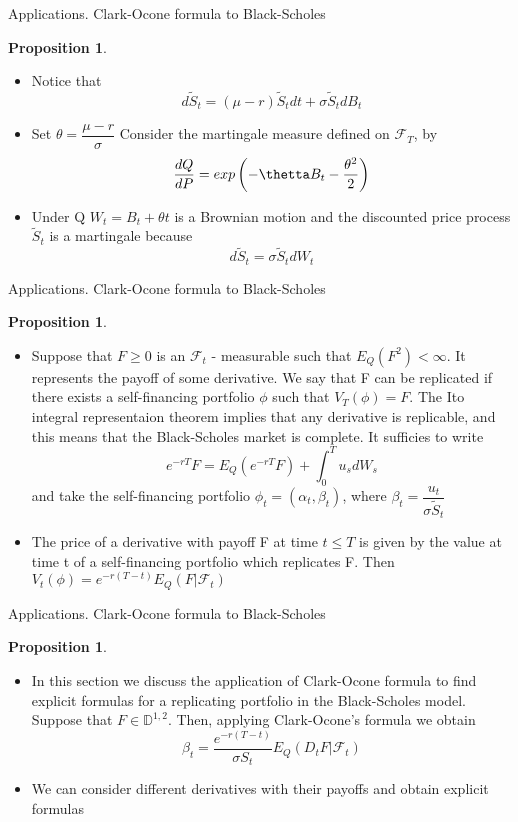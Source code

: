 \documentclass{beamer}%
\theoremstyle{definition}
\newtheorem{proposition}[theorem]{Proposition}
\begin{document}
\begin{frame}{Applications. Clark-Ocone formula to Black-Scholes}
\begin{proposition}
\begin{itemize}

\item Notice that $$d\tilde{S}_t = (\mu - r)\tilde{S}_tdt + \sigma \tilde{S}_t dB_t$$
\item Set $\theta = \dfrac{\mu - r}{\sigma}$ Consider the martingale measure defined on $\mathcal{F}_T$, by 
$$\dfrac{dQ}{dP} = exp\left(-\thetta B_t - \dfrac{\theta^2}{2}\right)$$
\item Under Q $W_t = B_t + \theta t$ is a Brownian motion and the discounted price process $\tilde{S}_t$ is a martingale because
$$d\tilde{S}_t = \sigma \tilde{S}_t dW_t$$
\end{itemize}
\end{proposition}
\end{frame}

\begin{frame}{Applications. Clark-Ocone formula to Black-Scholes}
\begin{proposition}
\begin{itemize}

\item Suppose that $F \ge 0$ is an $\mathcal{F}_t$ - measurable such that $E_{Q}(F^2) < \infty$. It represents the payoff of some derivative. We say that F can be replicated if there exists a self-financing portfolio $\phi$ such that $V_{T}(\phi) = F$. The Ito integral representaion theorem implies that any derivative is replicable, and this means that the Black-Scholes market is complete. It sufficies to write
$$e^{-rT}F = E_{Q}(e^{-rT}F) + \int_{0}^{T} u_sdW_s$$
and take the self-financing portfolio $\phi_t = (\alpha_t, \beta_t)$, where $\beta_t = \dfrac{u_t}{\sigma \tilde{S}_t}$
\item The price of a derivative with payoff F at time $t \leq T$ is given by the value at time t of a self-financing portfolio which replicates F. Then $V_t(\phi)  = e^{-r(T-t)}E_{Q}(F|\mathcal{F}_t)$ 
\end{itemize}
\end{proposition}
\end{frame}

\begin{frame}{Applications. Clark-Ocone formula to Black-Scholes}
\begin{proposition}
\begin{itemize}

\item In this section we discuss the application of Clark-Ocone formula to find explicit formulas for a replicating portfolio in the Black-Scholes model. Suppose that $F \in \mathbb{D}^{1,2}$. Then, applying Clark-Ocone's formula we obtain 
$$\beta_t = \dfrac{e^{-r(T-t)}}{\sigma S_t}E_Q(D_tF|\mathcal{F}_t)$$
\item We can consider different derivatives with their payoffs and obtain explicit formulas
\end{itemize}
\end{proposition}
\end{frame}
\end{document}
